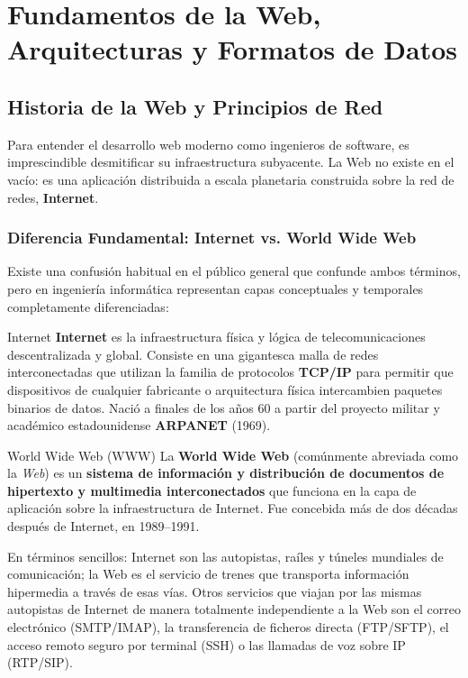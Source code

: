 \chapter{Fundamentos de la Web, Arquitecturas y Formatos de Datos}
\label{cap:tema1}

\section{Historia de la Web y Principios de Red}

Para entender el desarrollo web moderno como ingenieros de software, es imprescindible desmitificar su infraestructura subyacente. La Web no existe en el vacío: es una aplicación distribuida a escala planetaria construida sobre la red de redes, \textbf{Internet}.

\subsection{Diferencia Fundamental: Internet vs. World Wide Web}

Existe una confusión habitual en el público general que confunde ambos términos, pero en ingeniería informática representan capas conceptuales y temporales completamente diferenciadas:

\begin{definicion}{Internet}
\textbf{Internet} es la infraestructura física y lógica de telecomunicaciones descentralizada y global. Consiste en una gigantesca malla de redes interconectadas que utilizan la familia de protocolos \textbf{TCP/IP} para permitir que dispositivos de cualquier fabricante o arquitectura física intercambien paquetes binarios de datos. Nació a finales de los años 60 a partir del proyecto militar y académico estadounidense \textbf{ARPANET} (1969).
\end{definicion}

\begin{definicion}{World Wide Web (WWW)}
La \textbf{World Wide Web} (comúnmente abreviada como la \textit{Web}) es un \textbf{sistema de información y distribución de documentos de hipertexto y multimedia interconectados} que funciona en la capa de aplicación sobre la infraestructura de Internet. Fue concebida más de dos décadas después de Internet, en 1989--1991.
\end{definicion}

En términos sencillos: Internet son las autopistas, raíles y túneles mundiales de comunicación; la Web es el servicio de trenes que transporta información hipermedia a través de esas vías. Otros servicios que viajan por las mismas autopistas de Internet de manera totalmente independiente a la Web son el correo electrónico (SMTP/IMAP), la transferencia de ficheros directa (FTP/SFTP), el acceso remoto seguro por terminal (SSH) o las llamadas de voz sobre IP (RTP/SIP).

